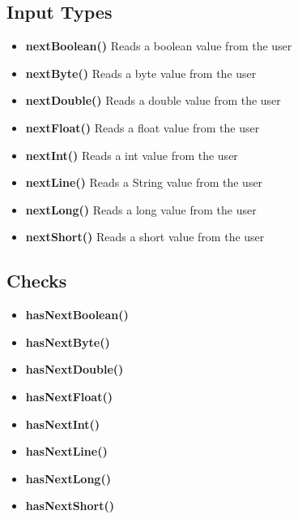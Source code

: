 \documentclass{report}
\begin{document}
    \subsection{Input Types}
    \begin{itemize}
        \item \textbf{nextBoolean()}	Reads a boolean value from the user
        \item \textbf{nextByte()}	Reads a byte value from the user
        \item \textbf{nextDouble()}	Reads a double value from the user
        \item \textbf{nextFloat()}	Reads a float value from the user
        \item \textbf{nextInt()}	Reads a int value from the user
        \item \textbf{nextLine()}	Reads a String value from the user
        \item \textbf{nextLong()}	Reads a long value from the user
        \item \textbf{nextShort()}	Reads a short value from the user
    \end{itemize}

    \bigbreak \noindent 
    \subsection{Checks}
    \begin{itemize}
        \item \textbf{hasNextBoolean()}	
        \item \textbf{hasNextByte()}
        \item \textbf{hasNextDouble()}
        \item \textbf{hasNextFloat()}	
        \item \textbf{hasNextInt()}	
        \item \textbf{hasNextLine()}	
        \item \textbf{hasNextLong()}
        \item \textbf{hasNextShort()}	
    \end{itemize}

    \pagebreak 
    \bigbreak \noindent 
\end{document}
